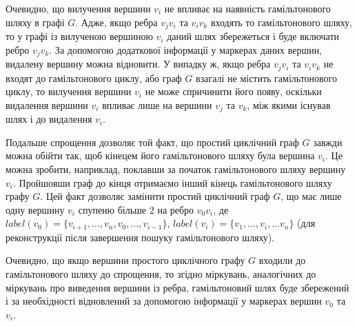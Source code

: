 \documentclass[a4paper,14pt,ukrainian]{extarticle}
\begin{document}
    Очевидно, що вилучення вершини $v_i$ не впливає на наявність гамільтонового шляху в графі $G$.
    Адже, якщо ребра $v_j$$v_i$ та $v_i$$v_k$ входять то гамільтонового шляху, то у графі із вилученою вершиною $v_i$ даний шлях збережеться і буде включати ребро $v_j$$v_k$.
    За допомогою додаткової інформації у маркерах даних вершин, видалену вершину можна відновити.
    У випадку ж, якщо ребра $v_j$$v_i$ та $v_i$$v_k$ не входят до гамільтонового циклу, або граф $G$ взагалі не містить гамільтонового циклу, то вилучення вершини $v_i$ не може спричинити його появу, оскільки видалення вершини $v_i$ впливає лише на вершини $v_j$ та $v_k$, між якими існував шлях і до видалення $v_i$.

    Подальше спрощення дозволяє той факт, що простий циклічний граф $G$ завжди можна обійти так, щоб кінецем його гамільтонового шляху була вершина $v_i$.
    Це можна зробити, наприклад, поклавши за початок гамільтонового шляху вершину $v_i$.
    Пройшовши граф до кінця отримаємо інший кінець гамільтонового шляху графу $G$.
    Цей факт дозволяє замінити простий циклічний граф $G$, що має лише одну вершину $v_i$ спупеню більше 2 на ребро $v_0$$v_i$, де $label(v_0)=\{ v_{i+1}, \dots , v_n, v_0, \dots , v_{i-1} \}$, $label(v_i)=\{ v_1, \dots, v_i, \dots v_n \}$ (для реконструкції після завершення пошуку гамільтонового шляху).
    \begin{figure}[h]
    \end{figure}
    Очевидно, що якщо вершини простого циклічного графу $G$ входили до гамільтонового шляху до спрощення, то згідно міркувань, аналогічних до міркувань про виведення вершини із ребра, гамільтоновий шлях буде збережений і за необхідності відновлений за допомогою інформації у маркерах вершин $v_0$ та $v_i$.
\end{document}

